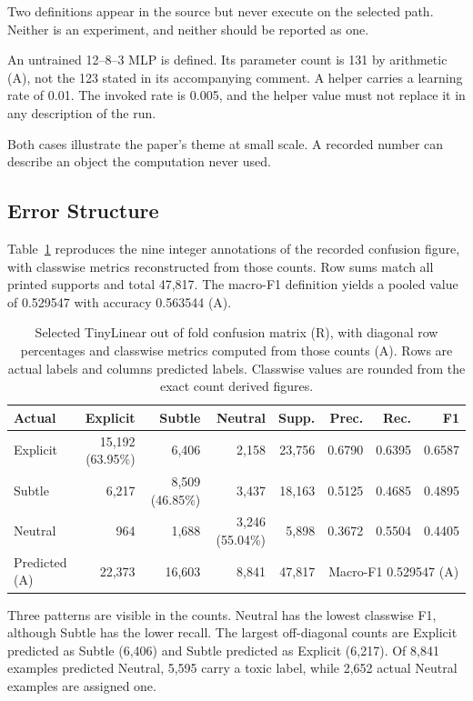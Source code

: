 \documentclass[runningheads]{llncs}
\begin{document}
Two definitions appear in the source but never execute on the selected path. Neither is an experiment, and neither should be reported as one.

An untrained 12--8--3 MLP is defined. Its parameter count is 131 by arithmetic (A), not the 123 stated in its accompanying comment. A helper carries a learning rate of 0.01. The invoked rate is 0.005, and the helper value must not replace it in any description of the run.

Both cases illustrate the paper's theme at small scale. A recorded number can describe an object the computation never used.

\subsection{Error Structure}

Table~\ref{tab:confusion} reproduces the nine integer annotations of the recorded confusion figure, with classwise metrics reconstructed from those counts. Row sums match all printed supports and total 47,817. The macro-F1 definition yields a pooled value of 0.529547 with accuracy 0.563544 (A).

\begin{table}[t]
\centering
\caption{Selected TinyLinear out of fold confusion matrix (R), with diagonal row percentages and classwise metrics computed from those counts (A). Rows are actual labels and columns predicted labels. Classwise values are rounded from the exact count derived figures.}
\label{tab:confusion}
\begin{tabular}{lrrrrrrr}
\toprule
Actual & Explicit & Subtle & Neutral & Supp. & Prec. & Rec. & F1 \\
\midrule
Explicit & 15,192 (63.95\%) & 6,406 & 2,158 & 23,756 & 0.6790 & 0.6395 & 0.6587 \\
Subtle & 6,217 & 8,509 (46.85\%) & 3,437 & 18,163 & 0.5125 & 0.4685 & 0.4895 \\
Neutral & 964 & 1,688 & 3,246 (55.04\%) & 5,898 & 0.3672 & 0.5504 & 0.4405 \\
\midrule
Predicted (A) & 22,373 & 16,603 & 8,841 & 47,817 & \multicolumn{3}{c}{Macro-F1 0.529547 (A)} \\
\bottomrule
\end{tabular}
\end{table}

Three patterns are visible in the counts. Neutral has the lowest classwise F1, although Subtle has the lower recall. The largest off-diagonal counts are Explicit predicted as Subtle (6,406) and Subtle predicted as Explicit (6,217). Of 8,841 examples predicted Neutral, 5,595 carry a toxic label, while 2,652 actual Neutral examples are assigned one.
\end{document}
